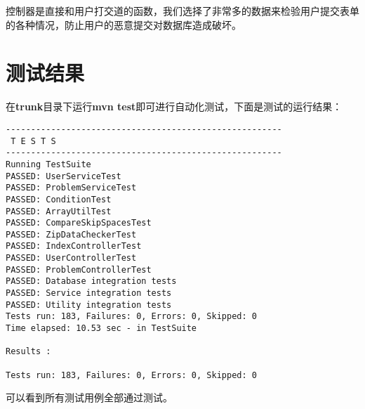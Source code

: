 控制器是直接和用户打交道的函数，我们选择了非常多的数据来检验用户提交表单的各种情况，防止用户的恶意提交对数据库造成破坏。

\section{测试结果}
在\textbf{trunk}目录下运行\textbf{mvn test}即可进行自动化测试，下面是测试的运行结果：
\begin{verbatim}
-------------------------------------------------------
 T E S T S
-------------------------------------------------------
Running TestSuite
PASSED: UserServiceTest
PASSED: ProblemServiceTest
PASSED: ConditionTest
PASSED: ArrayUtilTest
PASSED: CompareSkipSpacesTest
PASSED: ZipDataCheckerTest
PASSED: IndexControllerTest
PASSED: UserControllerTest
PASSED: ProblemControllerTest
PASSED: Database integration tests
PASSED: Service integration tests
PASSED: Utility integration tests
Tests run: 183, Failures: 0, Errors: 0, Skipped: 0
Time elapsed: 10.53 sec - in TestSuite

Results :

Tests run: 183, Failures: 0, Errors: 0, Skipped: 0
\end{verbatim}
可以看到所有测试用例全部通过测试。